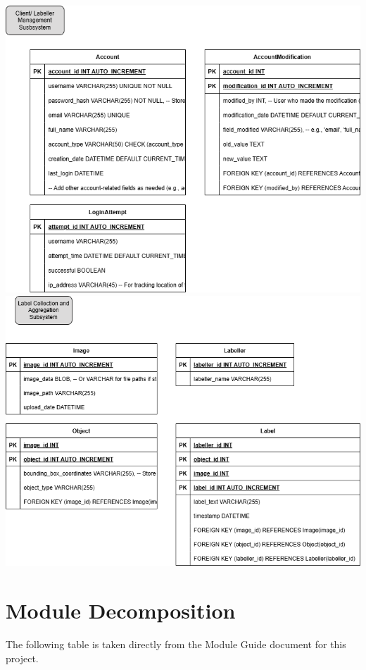 \documentclass[12pt, titlepage]{article}
\begin{document}
\includegraphics[scale=0.5]{dt2.png}\\
\includegraphics[scale=0.5]{dt5.png}\\

\newpage 
\section{Module Decomposition}

The following table is taken directly from the Module Guide document for this project.
\end{document}
